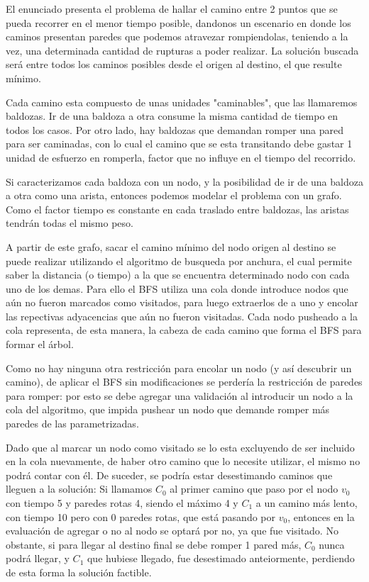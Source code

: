 El enunciado presenta el problema de hallar el camino entre 2 puntos que se pueda recorrer en el menor tiempo posible, dandonos un escenario en donde los caminos presentan paredes que podemos atravezar rompiendolas, teniendo a la vez, una determinada cantidad de rupturas a poder realizar. La solución buscada será entre todos los caminos posibles desde el origen al destino, el que resulte mínimo.

Cada camino esta compuesto de unas unidades "caminables", que las llamaremos baldozas. Ir de una baldoza a otra consume la misma cantidad de tiempo en todos los casos. Por otro lado, hay 
baldozas que demandan romper una pared para ser caminadas, con lo cual el camino que se esta transitando debe gastar 1 unidad de esfuerzo en romperla, factor que no influye en el tiempo del recorrido.

Si caracterizamos cada baldoza con un nodo, y la posibilidad de ir de una baldoza a otra como una arista, entonces podemos modelar el problema con un grafo. Como el factor tiempo es constante en cada traslado entre baldozas, las aristas tendrán todas el mismo peso.

A partir de este grafo, sacar el camino mínimo del nodo origen al destino se puede realizar utilizando el algoritmo de busqueda por anchura, el cual permite saber la distancia (o tiempo) a la que se encuentra determinado nodo con cada uno de los demas. Para ello el BFS utiliza una cola donde introduce nodos que aún no fueron marcados como visitados, para luego extraerlos de a uno y encolar las repectivas adyacencias que aún no fueron visitadas. Cada nodo pusheado a la cola representa, de esta manera, la cabeza de cada camino que forma el BFS para formar el árbol. 

Como no hay ninguna otra restricci\'on para encolar un nodo (y as\'i descubrir un camino), de aplicar el BFS sin modificaciones se perdería la restricci\'on de paredes para romper: por esto se debe agregar una validación al introducir un nodo a la cola del algoritmo, que impida pushear un nodo que demande romper más paredes de las parametrizadas.

Dado que al marcar un nodo como visitado se lo esta excluyendo de ser incluido en la cola nuevamente, de haber otro camino que lo necesite utilizar, el mismo no podrá contar con él. De suceder, se podr\'ia estar desestimando caminos que lleguen a la soluci\'on: Si llamamos $C_0$ al primer camino que paso por el nodo $v_0$ con tiempo 5 y paredes rotas 4, siendo el m\'aximo 4 y $C_1$ a un camino más lento, con tiempo 10 pero con 0 paredes rotas, que está pasando por $v_0$, entonces en la evaluación de agregar o no al nodo se optará por no, ya que fue visitado. No obstante, si para llegar al destino final se debe romper 1 pared más, $C_0$ nunca podrá llegar, y $C_1$ que hubiese llegado, fue desestimado anteiormente, perdiendo de esta forma la solución factible.

